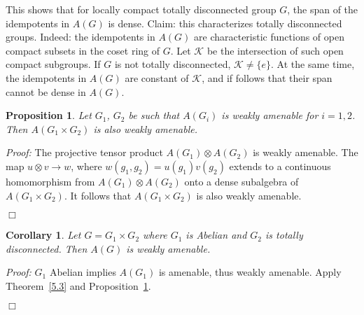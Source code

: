 \documentclass[12 pt]{article}
\newcommand\done{\begin{flushright}$\Box$\end{flushright}}
\newtheorem{prop}[defn]{Proposition}
\newtheorem{cor}[defn]{Corollary}
\begin{document}
This shows that for locally compact totally disconnected group $G$, the span of the
idempotents in $A(G)$ is dense.  Claim: this characterizes totally disconnected groups.
Indeed: the idempotents in $A(G)$ are characteristic functions of open compact subsets
in the coset ring of $G$.  Let $\mathcal{K}$ be the intersection of such open compact
subgroups.  If $G$ is not totally disconnected, $\mathcal{K} \neq \{e\}$.  At the same
time, the idempotents in $A(G)$ are constant of $\mathcal{K}$, and if follows that
their span cannot be dense in $A(G)$.

\pagebreak
\begin{prop}\label{5.4}
Let $G_1$, $G_2$ be such that $A(G_i)$ is weakly amenable for $i=1,2$.  Then
$A(G_1 \times G_2)$ is also weakly amenable.
\end{prop}
{\it Proof:}
The projective tensor product $A(G_1)\otimes A(G_2)$ is weakly amenable.
The map $u\otimes v \rightarrow w$, where $w(g_1,g_2) = u(g_1)v(g_2)$ extends to
a continuous homomorphism from $A(G_1)\otimes A(G_2)$ onto a dense subalgebra
of $A(G_1 \times G_2)$.  It follows that $A(G_1 \times G_2)$ is also weakly amenable.
\done

\begin{cor}
Let $G=G_1 \times G_2$ where $G_1$ is Abelian and $G_2$ is totally disconnected.  Then
$A(G)$ is weakly amenable.
\end{cor}
{\it Proof:}  $G_1$ Abelian implies $A(G_1)$ is amenable, thus weakly amenable.
Apply Theorem~\ref{5.3} and Proposition~\ref{5.4}.
\done
\end{document}
